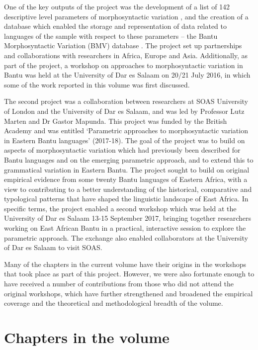 \documentclass[output=paper]{langscibook}
\begin{document}
One of the key outputs of the project was the development of a list of 142 descriptive level parameters of morphosyntactic variation \citep{GuéroisEtAl2017}, and the creation of a database which enabled the storage and representation of data related to languages of the sample with respect to these parameters – the Bantu Morphosyntactic Variation (BMV) database \citep{MartenEtAl2018}. The project set up partnerships and collaborations with researchers in Africa, Europe and Asia. Additionally, as part of the project, a workshop on approaches to morphosyntactic variation in Bantu was held at the University of Dar es Salaam on 20/21 {July 2016}, in which some of the work reported in this volume was first discussed.

The second project was a collaboration between researchers at SOAS University of London and the University of Dar es Salaam, and was led by Professor Lutz Marten and Dr Gastor Mapunda. This project was funded by the British Academy and was entitled ‘Parametric approaches to morphosyntactic variation in Eastern Bantu languages’ (2017-18). The goal of the project was to build on aspects of morphosyntactic variation which had previously been described for Bantu languages and on the emerging parametric approach, and to extend this to grammatical variation in Eastern Bantu. The project sought to build on original empirical evidence from some twenty Bantu languages of Eastern Africa, with a view to contributing to a better understanding of the historical, comparative and typological patterns that have shaped the linguistic landscape of East Africa. In specific terms, the project enabled a second workshop which was held at the University of Dar es Salaam 13-15 {September 2017}, bringing together researchers working on East African Bantu in a practical, interactive session to explore the parametric approach. The exchange also enabled collaborators at the University of Dar es Salaam to visit SOAS.

Many of the chapters in the current volume have their origins in the workshops that took place as part of this project. However, we were also fortunate enough to have received a number of contributions from those who did not attend the original workshops, which have further strengthened and broadened the empirical coverage and the theoretical and methodological breadth of the volume. 

\section{Chapters in the volume}
\end{document}
